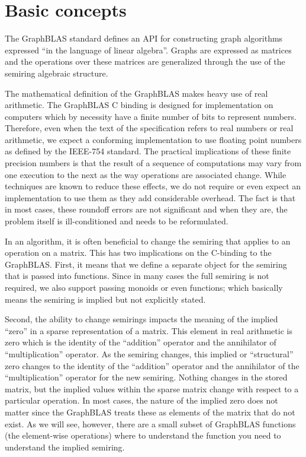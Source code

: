 \chapter{Basic concepts}

The GraphBLAS standard defines an API for constructing
graph algorithms expressed ``in the language of linear algebra''.
Graphs are expressed as matrices and the operations over 
these matrices are generalized through the use of the
semiring algebraic structure.

The mathematical definition of the GraphBLAS makes heavy use
of real arithmetic.   The GraphBLAS C binding is designed for
implementation on computers which by necessity have a finite number
of bits to represent numbers.   Therefore, even when the 
text of the specification refers to real numbers or real arithmetic, we 
expect a conforming implementation to use floating point numbers
as defined by the IEEE-754 standard.  The practical implications
of these finite precision numbers is that the result of a sequence
of computations may vary from one execution to the next as the
way operations are associated change.  While 
techniques are known to reduce these effects, we do not require or
even expect an implementation to use them as they add
considerable overhead.  The fact is that in most cases, these
roundoff errors are not significant and when they are, the problem
itself is ill-conditioned and needs to be reformulated.

In an algorithm, it is often beneficial to change the semiring
that applies to an operation on a matrix.  This has two 
implications on the C-binding to the GraphBLAS.  First,
it means that we define a separate object for the semiring 
that is passed into functions.  Since in many cases the full
semiring is not required, we also support passing monoids or
even functions; which basically means the semiring is implied but not 
explicitly stated.

Second, the ability to change semirings impacts the meaning of 
the implied ``zero'' in a sparse representation of a matrix.
This element in real arithmetic is zero which is the 
identity of the ``addition'' operator and the annihilator of
``multiplication'' operator.   As the semiring changes, this 
implied or ``structural'' zero changes to the identity of 
the ``addition'' operator and the annihilator of the ``multiplication'' 
operator for the new semiring.   Nothing changes in the
stored matrix, but the implied values within the sparse matrix change
with respect to a particular operation.  In most cases, the nature
of the implied zero does not matter since the GraphBLAS treats these
as elements of the matrix that do not exist.  As we will see, however,
there are a small subset of GraphBLAS functions 
(the element-wise operations) where to understand 
the function you need to understand the implied semiring.

